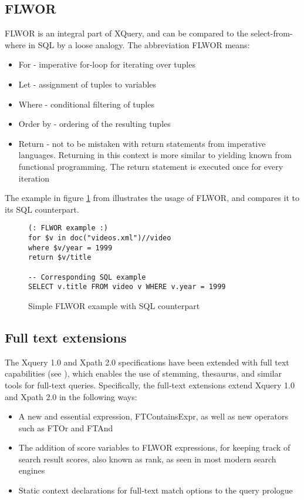\subsection{FLWOR}
FLWOR is an integral part of XQuery, and can be compared to the select-from-where in SQL by a loose analogy. The abbreviation FLWOR means:
\begin{itemize}
\item For - imperative for-loop for iterating over tuples
\item Let - assignment of tuples to variables
\item Where - conditional filtering of tuples
\item Order by - ordering of the resulting tuples
\item Return - not to be mistaken with return statements from imperative languages. Returning in this context is more similar to yielding known from functional programming. The return statement is executed once for every iteration
\end{itemize}
The example in figure \ref{code:theory:flwor} from \cite{styl00} illustrates
the usage of FLWOR, and  compares it to its SQL counterpart.
\begin{figure}
\begin{Verbatim}
(: FLWOR example :)
for $v in doc("videos.xml")//video
where $v/year = 1999
return $v/title

-- Corresponding SQL example 
SELECT v.title FROM video v WHERE v.year = 1999
\end{Verbatim}
\caption[Simple FLWOR example]{Simple FLWOR example with SQL counterpart}
\label{code:theory:flwor}
\end{figure}

\subsection{Full text extensions}
The Xquery 1.0  and Xpath 2.0 specifications have been extended with full text
capabilities (see \cite{w3c02}), which enables the use of stemming, thesaurus,
and similar tools for full-text queries. Specifically, the full-text extensions
extend Xquery 1.0 and Xpath 2.0 in the following ways:
\begin{itemize}
\item A new and essential expression, FTContainsExpr, as well as new operators
such as FTOr and FTAnd 
\item The addition of score variables to FLWOR expressions, for keeping track
of search result scores, also known as rank, as seen in most modern search
engines 
\item Static context declarations for full-text match options to the query
prologue 
\end{itemize}

